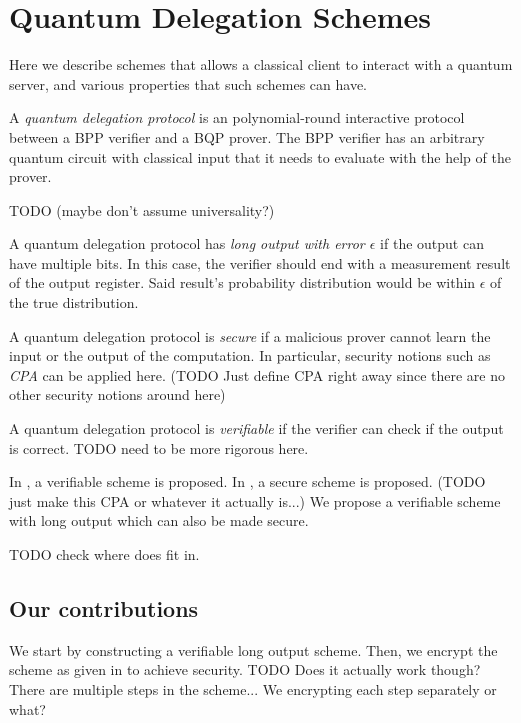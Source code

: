 \section{Quantum Delegation Schemes}

Here we describe schemes that allows a classical client to interact with a quantum server, and various properties that such schemes can have.

\begin{definition}
	A \emph{quantum delegation protocol} is an polynomial-round interactive protocol between a BPP verifier and a BQP prover. The BPP verifier has an arbitrary quantum circuit with classical input that it needs to evaluate with the help of the prover.
\end{definition}

TODO (maybe don't assume universality?)

\begin{definition}
	A quantum delegation protocol has \emph{long output with error $\epsilon$} if the output can have multiple bits. In this case, the verifier should end with a measurement result of the output register. Said result's probability distribution would be within $\epsilon$ of the true distribution.
\end{definition}

\begin{definition}
	A quantum delegation protocol is \emph{secure} if a malicious prover cannot learn the input or the output of the computation. In particular, security notions such as \emph{CPA} can be applied here. (TODO Just define CPA right away since there are no other security notions around here)
\end{definition}

\begin{definition}
	A quantum delegation protocol is \emph{verifiable} if the verifier can check if the output is correct. TODO need to be more rigorous here.
\end{definition}

In \cite{mahadev_delegation}, a verifiable scheme is proposed. In \cite{mahadev_qfhe}, a secure scheme is proposed. (TODO just make this CPA or whatever it actually is...) We propose a verifiable scheme with long output which can also be made secure.

TODO check where does \cite{1904.06320} fit in.

\subsection{Our contributions}

We start by constructing a verifiable long output scheme. Then, we encrypt the scheme as given in \cite{mahadev_delegation} to achieve security. TODO Does it actually work though? There are multiple steps in the scheme... We encrypting each step separately or what?

